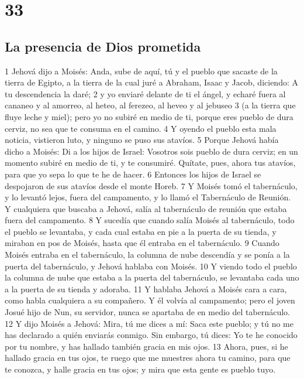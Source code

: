 \chapter{33}

\section*{La presencia de Dios prometida}

1 Jehová dijo a Moisés: Anda, sube de aquí, tú y el pueblo que sacaste de la tierra de Egipto, a la tierra de la cual juré a Abraham, Isaac y Jacob, diciendo: A tu descendencia la daré;
2 y yo enviaré delante de ti el ángel, y echaré fuera al cananeo y al amorreo, al heteo, al ferezeo, al heveo y al jebuseo
3 (a la tierra que fluye leche y miel); pero yo no subiré en medio de ti, porque eres pueblo de dura cerviz, no sea que te consuma en el camino.
4 Y oyendo el pueblo esta mala noticia, vistieron luto, y ninguno se puso sus atavíos.
5 Porque Jehová había dicho a Moisés: Di a los hijos de Israel: Vosotros sois pueblo de dura cerviz; en un momento subiré en medio de ti, y te consumiré. Quítate, pues, ahora tus atavíos, para que yo sepa lo que te he de hacer.
6 Entonces los hijos de Israel se despojaron de sus atavíos desde el monte Horeb.
7 Y Moisés tomó el tabernáculo, y lo levantó lejos, fuera del campamento, y lo llamó el Tabernáculo de Reunión. Y cualquiera que buscaba a Jehová, salía al tabernáculo de reunión que estaba fuera del campamento.
8 Y sucedía que cuando salía Moisés al tabernáculo, todo el pueblo se levantaba, y cada cual estaba en pie a la puerta de su tienda, y miraban en pos de Moisés, hasta que él entraba en el tabernáculo.
9 Cuando Moisés entraba en el tabernáculo, la columna de nube descendía y se ponía a la puerta del tabernáculo, y Jehová hablaba con Moisés.
10 Y viendo todo el pueblo la columna de nube que estaba a la puerta del tabernáculo, se levantaba cada uno a la puerta de su tienda y adoraba.
11 Y hablaba Jehová a Moisés cara a cara, como habla cualquiera a su compañero. Y él volvía al campamento; pero el joven Josué hijo de Nun, su servidor, nunca se apartaba de en medio del tabernáculo.
12 Y dijo Moisés a Jehová: Mira, tú me dices a mí: Saca este pueblo; y tú no me has declarado a quién enviarás conmigo. Sin embargo, tú dices: Yo te he conocido por tu nombre, y has hallado también gracia en mis ojos.
13 Ahora, pues, si he hallado gracia en tus ojos, te ruego que me muestres ahora tu camino, para que te conozca, y halle gracia en tus ojos; y mira que esta gente es pueblo tuyo.
